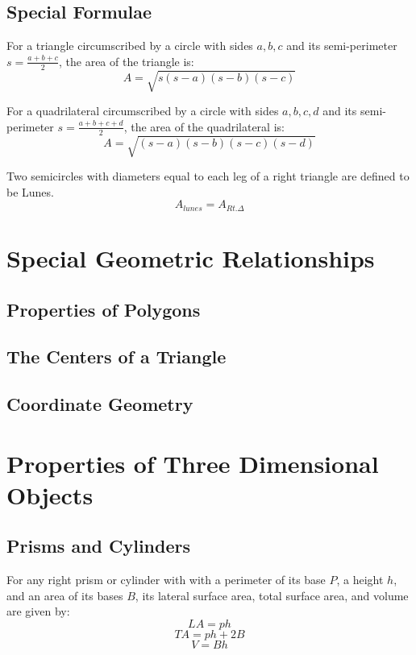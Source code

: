 \documentclass[draft, letterpaper, 12pt]{article}
\begin{document}
	\subsection{Special Formulae}\label{sec: Heron's and Brahmagupta's Formulae, Lunes}
	
		For a triangle circumscribed by a circle with sides $a, b, c$ and its semi-perimeter $s = \frac{a+b+c}{2}$, the area of the triangle is:
		\begin{equation}
			A = \sqrt{s(s-a)(s-b)(s-c)}
		\end{equation}
		
		For a quadrilateral circumscribed by a circle with sides $a, b, c, d$ and its semi-perimeter $s = \frac{a+b+c+d}{2}$, the area of the quadrilateral is:
		\begin{equation}
			A = \sqrt{(s-a)(s-b)(s-c)(s-d)}
		\end{equation}
		
		Two semicircles with diameters equal to each leg of a right triangle are defined to be Lunes.
		\begin{equation}
			A_{lunes} = A_{Rt.\Delta}
		\end{equation}
\section{Special Geometric Relationships}
	\subsection{Properties of Polygons}\label{sec: information about angles, diagonals, and other aspects of polygons}
	\subsection{The Centers of a Triangle}\label{sec: looking at the centroid, orthocenter, circumcenter, and incenter of a triangle}
	\subsection{Coordinate Geometry}\label{sec: ways of working with coordinates... in geometry}
\section{Properties of Three Dimensional Objects}
	\subsection{Prisms and Cylinders}\label{sec: simple formulae for the more simple objects}
		For any right prism or cylinder with with a perimeter of its base $P$, a height $h$, and an area of its bases $B$, its lateral surface area, total surface area, and volume are given by:
		\begin{equation}
			LA = ph
		\end{equation}
		\begin{equation}
			TA = ph+2B
		\end{equation}
		\begin{equation}
			V = Bh
		\end{equation}
\end{document}
